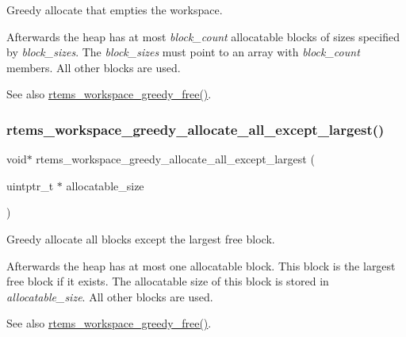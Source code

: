Greedy allocate that empties the workspace. 

Afterwards the heap has at most {\itshape block\+\_\+count} allocatable blocks of sizes specified by {\itshape block\+\_\+sizes}. The {\itshape block\+\_\+sizes} must point to an array with {\itshape block\+\_\+count} members. All other blocks are used.

\begin{DoxySeeAlso}{See also}
\mbox{\hyperlink{group__ClassicRTEMSWorkspace_gaaf063f7071bd9b97fca4fabfe7cd1166}{rtems\+\_\+workspace\+\_\+greedy\+\_\+free()}}. 
\end{DoxySeeAlso}
\mbox{\label{group__ClassicRTEMSWorkspace_ga631bbb4b9c5dab3b7da64412e1a19c16}} 
\subsubsection{\texorpdfstring{rtems\_workspace\_greedy\_allocate\_all\_except\_largest()}{rtems\_workspace\_greedy\_allocate\_all\_except\_largest()}}
{\footnotesize\ttfamily void$\ast$ rtems\+\_\+workspace\+\_\+greedy\+\_\+allocate\+\_\+all\+\_\+except\+\_\+largest (\begin{DoxyParamCaption}\item[{uintptr\+\_\+t $\ast$}]{allocatable\+\_\+size }\end{DoxyParamCaption})}



Greedy allocate all blocks except the largest free block. 

Afterwards the heap has at most one allocatable block. This block is the largest free block if it exists. The allocatable size of this block is stored in {\itshape allocatable\+\_\+size}. All other blocks are used.

\begin{DoxySeeAlso}{See also}
\mbox{\hyperlink{group__ClassicRTEMSWorkspace_gaaf063f7071bd9b97fca4fabfe7cd1166}{rtems\+\_\+workspace\+\_\+greedy\+\_\+free()}}. 
\end{DoxySeeAlso}
\mbox{\label{group__ClassicRTEMSWorkspace_gaaf063f7071bd9b97fca4fabfe7cd1166}} 
